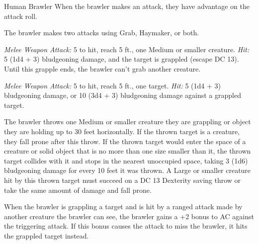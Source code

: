 \documentclass[10pt,a4paper,twoside,bg=print,twocolumn,openany,nodeprecatedcode]{dndbook}
\begin{document}
\begin{DndMonster}[float=t]{Human Brawler}
\DndMonsterBasics[
armor-class = {14 (studded leather armor)},
hit-points = {\DndDice{7d8 + 21}},
speed = {30 ft.}
]
\DndMonsterAbilityScores[
 str = 17,
 dex = 14,
 con = 16,
 int = 10,
 wis = 10,
 cha = 12
]
\DndMonsterDetails[
skills = {Athletics +5, Intimidation +3},
languages = {Common},
challenge = 2,
]
When the brawler makes an attack, they have advantage on the attack roll.

The brawler makes two attacks using Grab, Haymaker, or both.

\textsl{Melee Weapon Attack:} 5 to hit, reach 5 ft., one Medium or smaller creature. \textsl{Hit:} 5 (1d4 + 3) bludgeoning damage, and the target is grappled (escape DC 13). Until this grapple ends, the brawler can't grab another creature.

\textsl{Melee Weapon Attack:} 5 to hit, reach 5 ft., one target. \textsl{Hit:} 5 (1d4 + 3) bludgeoning damage, or 10 (3d4 + 3) bludgeoning damage against a grappled target.

The brawler throws one Medium or smaller creature they are grappling or object they are holding up to 30 feet horizontally. If the thrown target is a creature, they fall prone after this throw. If the thrown target would enter the space of a creature or solid object that is no more than one size smaller than it, the thrown target collides with it and stops in the nearest unoccupied space, taking 3 (1d6) bludgeoning damage for every 10 feet it was thrown. A Large or smaller creature hit by this thrown target must succeed on a DC 13 Dexterity saving throw or take the same amount of damage and fall prone.

When the brawler is grappling a target and is hit by a ranged attack made by another creature the brawler can see, the brawler gains a +2 bonus to AC against the triggering attack. If this bonus causes the attack to miss the brawler, it hits the grappled target instead.

\end{DndMonster}
\end{document}
